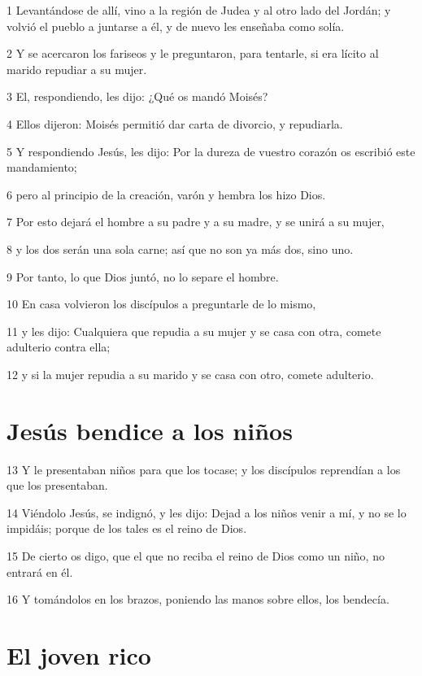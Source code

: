 \par 1 Levantándose de allí, vino a la región de Judea y al otro lado del Jordán; y volvió el pueblo a juntarse a él, y de nuevo les enseñaba como solía.
\par 2 Y se acercaron los fariseos y le preguntaron, para tentarle, si era lícito al marido repudiar a su mujer.
\par 3 El, respondiendo, les dijo: ¿Qué os mandó Moisés?
\par 4 Ellos dijeron: Moisés permitió dar carta de divorcio, y repudiarla.
\par 5 Y respondiendo Jesús, les dijo: Por la dureza de vuestro corazón os escribió este mandamiento;
\par 6 pero al principio de la creación, varón y hembra los hizo Dios.
\par 7 Por esto dejará el hombre a su padre y a su madre, y se unirá a su mujer,
\par 8 y los dos serán una sola carne; así que no son ya más dos, sino uno.
\par 9 Por tanto, lo que Dios juntó, no lo separe el hombre.
\par 10 En casa volvieron los discípulos a preguntarle de lo mismo,
\par 11 y les dijo: Cualquiera que repudia a su mujer y se casa con otra, comete adulterio contra ella;
\par 12 y si la mujer repudia a su marido y se casa con otro, comete adulterio.

\section*{Jesús bendice a los niños}

\par 13 Y le presentaban niños para que los tocase; y los discípulos reprendían a los que los presentaban.
\par 14 Viéndolo Jesús, se indignó, y les dijo: Dejad a los niños venir a mí, y no se lo impidáis; porque de los tales es el reino de Dios.
\par 15 De cierto os digo, que el que no reciba el reino de Dios como un niño, no entrará en él.
\par 16 Y tomándolos en los brazos, poniendo las manos sobre ellos, los bendecía.

\section*{El joven rico}

